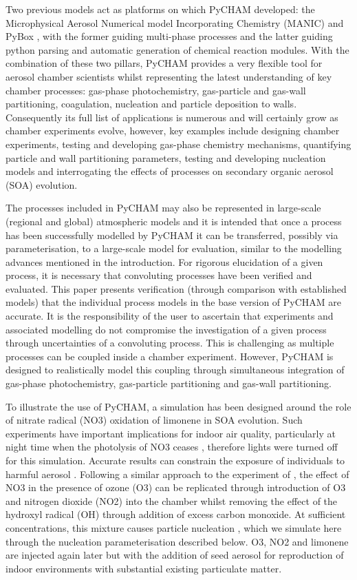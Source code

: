 \documentclass[gmd, manuscript]{copernicus}
\begin{document}
Two previous models act as platforms on which PyCHAM developed: the Microphysical Aerosol Numerical model Incorporating Chemistry (MANIC) \citep{Lowe2009} and PyBox \citep{Topping2018}, with the former guiding multi-phase processes and the latter guiding python parsing and automatic generation of chemical reaction modules.  With the combination of these two pillars, PyCHAM provides a very flexible tool for aerosol chamber scientists whilst representing the latest understanding of key chamber processes: gas-phase photochemistry, gas-particle and gas-wall partitioning, coagulation, nucleation and particle deposition to walls.  Consequently its full list of applications is numerous and will certainly grow as chamber experiments evolve, however, key examples include designing chamber experiments, testing and developing gas-phase chemistry mechanisms, quantifying particle and wall partitioning parameters, testing and developing nucleation models and interrogating the effects of processes on secondary organic aerosol (SOA) evolution.

The processes included in PyCHAM may also be represented in large-scale (regional and global) atmospheric models and it is intended that once a process has been successfully modelled by PyCHAM it can be transferred, possibly via parameterisation, to a large-scale model for evaluation, similar to the modelling advances mentioned in the introduction.  For rigorous elucidation of a given process, it is necessary that convoluting processes have been verified and evaluated.  This paper presents verification (through comparison with established models) that the individual process models in the base version of PyCHAM are accurate.  It is the responsibility of the user to ascertain that experiments and associated modelling do not compromise the investigation of a given process through uncertainties of a convoluting process.  This is challenging as multiple processes can be coupled inside a chamber experiment.  However, PyCHAM is designed to realistically model this coupling through simultaneous integration of gas-phase photochemistry, gas-particle partitioning and gas-wall partitioning.

To illustrate the use of PyCHAM, a simulation has been designed around the role of nitrate radical (NO3) oxidation of limonene in SOA evolution.  Such experiments have important implications for indoor air quality, particularly at night time when the photolysis of NO3 ceases \citep{Waring2015}, therefore lights were turned off for this simulation.  Accurate results can constrain the exposure of individuals to harmful aerosol \citep{Carslaw2019}.  Following a similar approach to the experiment of \citet{Fry2011}, the effect of NO3 in the presence of ozone (O3) can be replicated through introduction of O3 and nitrogen dioxide (NO2) into the chamber whilst removing the effect of the hydroxyl radical (OH) through addition of excess carbon monoxide.  At sufficient concentrations, this mixture causes particle nucleation \citep{Fry2011}, which we simulate here through the nucleation parameterisation described below.  O3, NO2 and limonene are injected again later but with the addition of seed aerosol for reproduction of indoor environments with substantial existing particulate matter.
\end{document}
